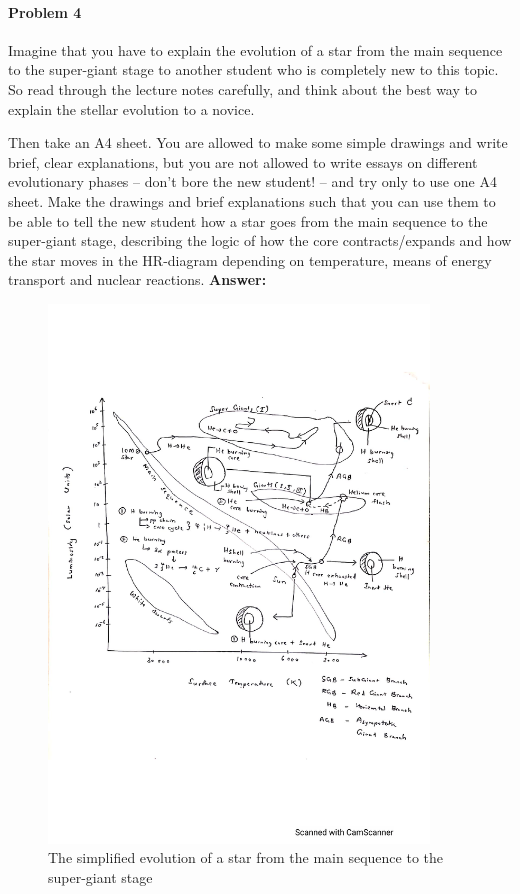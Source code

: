 \documentclass[11pt]{scrartcl}
\begin{document}
{\paragraph*{Problem 4}
Imagine that you have to explain the evolution of a star from the main sequence to the super-giant stage to another student who is completely new to this topic. So read through the lecture notes carefully, and think about the best
way to explain the stellar evolution to a novice.

Then take an A4 sheet. You are allowed to make some simple drawings and write brief, clear explanations, but
you are not allowed to write essays on different evolutionary phases – don’t bore the new student! – and try only
to use one A4 sheet. Make the drawings and brief explanations such that you can use them to be able to tell the
new student how a star goes from the main sequence to the super-giant stage, describing the logic of how the core
contracts/expands and how the star moves in the HR-diagram depending on temperature, means of energy transport
and nuclear reactions.
\newpage \textbf{Answer: }
\begin{figure}[H]
    \centering
    \includegraphics[width=0.9\textwidth]{Evolution.pdf}
    \caption{The simplified evolution of a star from the main sequence to the super-giant stage}
    \label{fig: PaleBlueDot}    
\end{figure}

}
\end{document}
